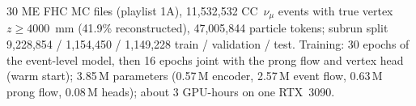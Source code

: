 30 ME FHC MC files (playlist 1A), 11{,}532{,}532 CC~$\nu_\mu$ events with true vertex $z \ge 4000$~mm (41.9\% reconstructed), 47{,}005{,}844 particle tokens; subrun split 9{,}228{,}854 / 1{,}154{,}450 / 1{,}149{,}228 train / validation / test. Training: 30 epochs of the event-level model, then 16 epochs joint with the prong flow and vertex head (warm start); 3.85\,M parameters (0.57\,M encoder, 2.57\,M event flow, 0.63\,M prong flow, 0.08\,M heads); about 3 GPU-hours on one RTX~3090.
